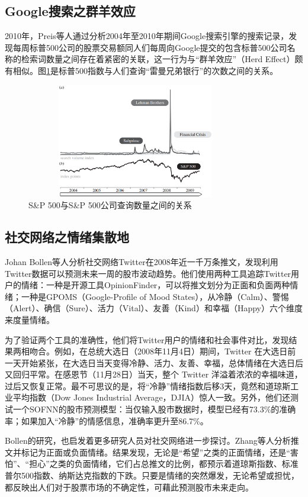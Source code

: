 \subsection{Google搜索之群羊效应}
2010年，Preis等人通过分析2004年至2010年期间Google搜索引擎的搜索记录\cite{preis2010complex}，发现每周标普500公司的股票交易额同人们每周向Google提交的包含标普500公司名称的检索词数量之间存在着紧密的关联，这一行为与“群羊效应”（Herd Effect）颇有相似。图\ref{eq:sp500withquery}是标普500指数与人们查询“雷曼兄弟银行”的次数之间的关系。
\begin{figure}
  \centering
  \includegraphics[width=0.85\textwidth,height=5cm]{figures/sp500withquery.eps}
  \caption{S\&P 500与S\&P 500公司查询数量之间的关系}\label{eq:sp500withquery}
\end{figure}

\subsection{社交网络之情绪集散地}
Johan Bollen等人\cite{bollen2011twitter}分析社交网络Twitter在2008年近一千万条推文，发现利用Twitter数据可以预测未来一周的股市波动趋势。他们使用两种工具追踪Twitter用户的情绪：一种是开源工具OpinionFinder，可以将推文划分为正面和负面两种情绪；一种是GPOMS（Google-Profile of Mood States），从冷静（Calm）、警惕（Alert）、确信（Sure）、活力（Vital）、友善（Kind）和幸福（Happy）六个维度来度量情绪。

为了验证两个工具的准确性，他们将Twitter用户的情绪和社会事件对比，发现结果两相吻合。例如，在总统大选日（2008年11月4日）期间，Twitter 在大选日前一天开始紧张，在大选日当天变得冷静、活力、友善、幸福，总体情绪在大选日后又回归平常。在感恩节（11月28日）当天，整个 Twitter 洋溢着浓浓的幸福味道，过后又恢复正常。最不可思议的是，将“冷静”情绪指数后移3天，竟然和道琼斯工业平均指数（Dow Jones Industrial Average，DJIA）惊人一致。另外，他们还测试一个SOFNN的股市预测模型：当仅输入股市数据时，模型已经有73.3\%的准确率；如果加入“冷静”的情感信息，准确率更升至86.7\%。

Bollen的研究，也启发着更多研究人员对社交网络进一步探讨。Zhang等人\cite{zhang2011predicting}分析推文并标记为正面或负面情绪。结果发现，无论是“希望”之类的正面情绪，还是“害怕”、“担心”之类的负面情绪，它们占总推文的比例，都预示着道琼斯指数、标准普尔500指数、纳斯达克指数的下跌。只要是情绪的突然爆发，无论希望或担忧，都反映出人们对于股票市场的不确定性，可藉此预测股市未来走向。

